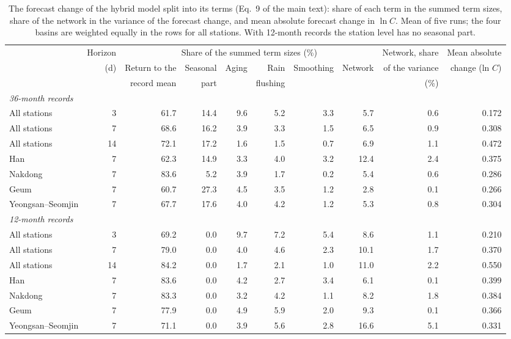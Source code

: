 \begin{table}[tbp]
\centering
\caption{The forecast change of the hybrid model split into its terms (Eq.~9 of the main text): share of each term in the summed term sizes, share of the network in the variance of the forecast change, and mean absolute forecast change in $\ln C$. Mean of five runs; the four basins are weighted equally in the rows for all stations. With 12-month records the station level has no seasonal part.}
\label{tab:S_terms}
\footnotesize
\setlength{\tabcolsep}{3.5pt}
\begin{adjustbox}{max width=\textwidth}
\begin{tabular}{lrrrrrrrrr}
\toprule
 & Horizon & \multicolumn{6}{c}{Share of the summed term sizes (\%)} & Network, share & Mean absolute \\ \cmidrule(lr){3-8}
 & (d) & Return to the & Seasonal & Aging & Rain & Smoothing & Network & of the variance & change (ln $C$) \\
 & & record mean & part & & flushing & & & (\%) & \\
\midrule
\multicolumn{10}{l}{\textit{36-month records}} \\
All stations & 3 & 61.7 & 14.4 & 9.6 & 5.2 & 3.3 & 5.7 & 0.6 & 0.172 \\
All stations & 7 & 68.6 & 16.2 & 3.9 & 3.3 & 1.5 & 6.5 & 0.9 & 0.308 \\
All stations & 14 & 72.1 & 17.2 & 1.6 & 1.5 & 0.7 & 6.9 & 1.1 & 0.472 \\
Han & 7 & 62.3 & 14.9 & 3.3 & 4.0 & 3.2 & 12.4 & 2.4 & 0.375 \\
Nakdong & 7 & 83.6 & 5.2 & 3.9 & 1.7 & 0.2 & 5.4 & 0.6 & 0.286 \\
Geum & 7 & 60.7 & 27.3 & 4.5 & 3.5 & 1.2 & 2.8 & 0.1 & 0.266 \\
Yeongsan--Seomjin & 7 & 67.7 & 17.6 & 4.0 & 4.2 & 1.2 & 5.3 & 0.8 & 0.304 \\
\midrule
\multicolumn{10}{l}{\textit{12-month records}} \\
All stations & 3 & 69.2 & 0.0 & 9.7 & 7.2 & 5.4 & 8.6 & 1.1 & 0.210 \\
All stations & 7 & 79.0 & 0.0 & 4.0 & 4.6 & 2.3 & 10.1 & 1.7 & 0.370 \\
All stations & 14 & 84.2 & 0.0 & 1.7 & 2.1 & 1.0 & 11.0 & 2.2 & 0.550 \\
Han & 7 & 83.6 & 0.0 & 4.2 & 2.7 & 3.4 & 6.1 & 0.1 & 0.399 \\
Nakdong & 7 & 83.3 & 0.0 & 3.2 & 4.2 & 1.1 & 8.2 & 1.8 & 0.384 \\
Geum & 7 & 77.9 & 0.0 & 4.9 & 5.9 & 2.0 & 9.3 & 0.1 & 0.366 \\
Yeongsan--Seomjin & 7 & 71.1 & 0.0 & 3.9 & 5.6 & 2.8 & 16.6 & 5.1 & 0.331 \\
\bottomrule
\end{tabular}
\end{adjustbox}
\end{table}
